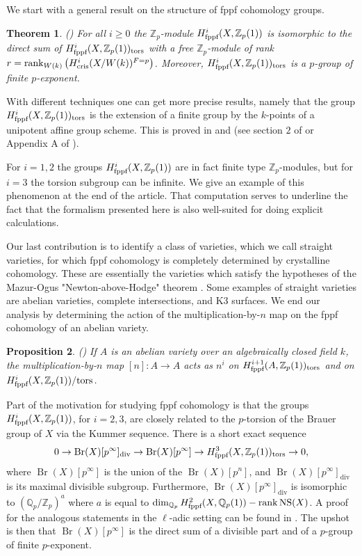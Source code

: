 \documentclass[11pt]{article}
\theoremstyle{plain}
\newtheorem{ThmS}{Theorem}[section]
\newtheorem{PropS}[ThmS]{Proposition}
\theoremstyle{definition}
\theoremstyle{remark}
\numberwithin{equation}{section}
\newenvironment{thms}[1]%
    { \begin{ThmS} \label{T:#1}}%
    { \end{ThmS} }
\newcommand{\ths}[1]{\begin{thms}{#1} \sl }
\newcommand{\eths}{\end{thms} }
\newenvironment{proposs}[1]%
    { \begin{PropS} \label{P:#1}}%
    { \end{PropS} }
\newcommand{\props}[1]{\begin{proposs}{#1}\sl }
\newcommand{\eprops}{\end{proposs}}
\newcommand{\Zp}{\mathbb{Z}_p}
\newcommand{\Qp}{\mathbb{Q}_p}
\DeclareMathOperator{\rk}{rank}                                          %
\newcommand{\W}{W}                                                       %
\DeclareMathOperator{\Br}{Br}                                            %
\DeclareMathOperator{\NS}{NS}
\newcommand\Hflat[1]{H^{#1}_{\textnormal{fppf}}}                         %
\newcommand\Hcris[1]{H^{#1}_{\textnormal{cris}}}                         %
\begin{document}
We start with a general result on the structure of fppf cohomology groups.

\ths{}() For all $i\ge0$ the $\Zp$-module $\Hflat{i}(X,\Zp(1))$ is isomorphic to the direct sum of $\Hflat{i}(X,\Zp(1))_{\text{tors}}$ with a free $\Zp$-module of rank $r=\rk_{\W(k)}\left(\Hcris{i}(X/\W(k))^{F=p}\right)$. Moreover, $\Hflat{i}(X,\Zp(1))_{\text{tors}}$ is a $p$-group of finite $p$-exponent.
\eths

With different techniques one can get more precise results, namely that the group $\Hflat{i}(X,\Zp(1))_{\text{tors}}$ is the extension of a finite group by the $k$-points of a unipotent affine group scheme. This is proved in \cite{illusieraynaud} and \cite{milnezeta} (see section $2$ of \cite{geissermotivic} or Appendix A of \cite{skorkunneth}). 

For $i=1,2$ the groups $\Hflat{i}(X,\Zp(1))$ are in fact finite type $\Zp$-modules, but for $i=3$ the torsion subgroup can be infinite. We give an example of this phenomenon at the end of the article. That computation serves to underline the fact that the formalism presented here is also well-suited for doing explicit calculations. 
 
Our last contribution is to identify a class of varieties, which we call straight varieties, for which fppf cohomology is completely determined by crystalline cohomology. These are essentially the varieties which satisfy the hypotheses of the Mazur-Ogus "Newton-above-Hodge" theorem \cite[Theorem 8.26]{berthelotogus}. Some examples of straight varieties are abelian varieties, complete intersections, and K3 surfaces. We end our analysis by determining the action of the multiplication-by-$n$ map on the fppf cohomology of an abelian variety.

\props{}() If $A$ is an abelian variety over an algebraically closed field $k$, the multiplication-by-$n$ map $[n]:A\to A$ acts as $n^{i}$ on $\Hflat{i+1}(A,\Zp(1))_{\text{tors}}$ and on $\Hflat{i}(X,\Zp(1))/\text{tors}$.
\eprops

Part of the motivation for studying fppf cohomology is that the groups $\Hflat{i}(X,\Zp(1))$, for $i=2,3$, are closely related to the $p$-torsion of the Brauer group of $X$ via the Kummer sequence. There is a short exact sequence
\begin{equation}\label{brauer}
0\to\Br(X)[p^{\infty}]_{\mathrm{div}}\to\Br(X)[p^{\infty}]\to\Hflat{3}(X,\Zp(1))_{\text{tors}}\to0,
\end{equation}
where $\Br(X)[p^{\infty}]$ is the union of the $\Br(X)[p^n]$, and $\Br(X)[p^{\infty}]_{\mathrm{div}}$ is its maximal divisible subgroup. Furthermore, $\Br(X)[p^{\infty}]_{\mathrm{div}}$ is isomorphic to $\left(\Qp/\Zp\right)^{a}$ where $a$ is equal to $\dim_{\Qp}\Hflat{2}(X,\Qp(1))-\rk\NS(X)$. A proof for the analogous statements in the $\ell$-adic setting can be found in \cite[Proposition 5.2.9]{ctsbrauer}. The upshot is then that $\Br(X)[p^{\infty}]$ is the direct sum of a divisible part and of a $p$-group of finite $p$-exponent. 
\end{document}
